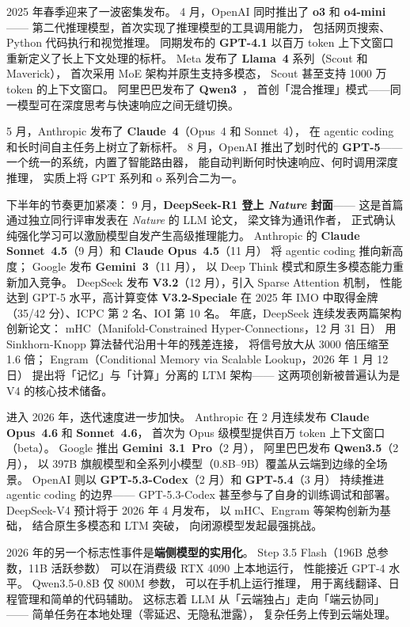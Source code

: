 2025 年春季迎来了一波密集发布。
4 月，OpenAI 同时推出了 \textbf{o3} 和 \textbf{o4-mini}——
第二代推理模型，首次实现了推理模型的工具调用能力，
包括网页搜索、Python 代码执行和视觉推理。
同期发布的 \textbf{GPT-4.1} 以百万 token 上下文窗口
重新定义了长上下文处理的标杆。
Meta 发布了 \textbf{Llama~4} 系列（Scout 和 Maverick），
首次采用 MoE 架构并原生支持多模态，
Scout 甚至支持 1000 万 token 的上下文窗口。
阿里巴巴发布了 \textbf{Qwen3}~\cite{qwen2025qwen3}，
首创「混合推理」模式——同一模型可在深度思考与快速响应之间无缝切换。

5 月，Anthropic 发布了 \textbf{Claude~4}（Opus~4 和 Sonnet~4），
在 agentic coding 和长时间自主任务上树立了新标杆。
8 月，OpenAI 推出了划时代的 \textbf{GPT-5}——
一个统一的系统，内置了智能路由器，
能自动判断何时快速响应、何时调用深度推理，
实质上将 GPT 系列和 o 系列合二为一。

下半年的节奏更加紧凑：
9 月，\textbf{DeepSeek-R1 登上 \textit{Nature} 封面}——
这是首篇通过独立同行评审发表在 \textit{Nature} 的 LLM 论文，
梁文锋为通讯作者，
正式确认纯强化学习可以激励模型自发产生高级推理能力。
Anthropic 的 \textbf{Claude Sonnet~4.5}（9 月）和 \textbf{Claude Opus~4.5}（11 月）
将 agentic coding 推向新高度；
Google 发布 \textbf{Gemini~3}（11 月），
以 Deep Think 模式和原生多模态能力重新加入竞争。
DeepSeek 发布 \textbf{V3.2}（12 月），引入 Sparse Attention 机制，
性能达到 GPT-5 水平，高计算变体 \textbf{V3.2-Speciale}
在 2025 年 IMO 中取得金牌（35/42 分）、ICPC 第 2 名、IOI 第 10 名。
年底，DeepSeek 连续发表两篇架构创新论文：
mHC（Manifold-Constrained Hyper-Connections，12 月 31 日）
用 Sinkhorn-Knopp 算法替代沿用十年的残差连接，
将信号放大从 3000 倍压缩至 1.6 倍；
Engram（Conditional Memory via Scalable Lookup，2026 年 1 月 12 日）
提出将「记忆」与「计算」分离的 LTM 架构——
这两项创新被普遍认为是 V4 的核心技术储备。

进入 2026 年，迭代速度进一步加快。
Anthropic 在 2 月连续发布 \textbf{Claude Opus~4.6} 和 \textbf{Sonnet~4.6}，
首次为 Opus 级模型提供百万 token 上下文窗口（beta）。
Google 推出 \textbf{Gemini~3.1~Pro}（2 月），
阿里巴巴发布 \textbf{Qwen3.5}（2 月），
以 397B 旗舰模型和全系列小模型（0.8B--9B）覆盖从云端到边缘的全场景。
OpenAI 则以 \textbf{GPT-5.3-Codex}（2 月）和 \textbf{GPT-5.4}（3 月）
持续推进 agentic coding 的边界——
GPT-5.3-Codex 甚至参与了自身的训练调试和部署。
DeepSeek-V4 预计将于 2026 年 4 月发布，
以 mHC、Engram 等架构创新为基础，
结合原生多模态和 LTM 突破，
向闭源模型发起最强挑战。

2026 年的另一个标志性事件是\textbf{端侧模型的实用化}。
Step 3.5 Flash（196B 总参数，11B 活跃参数）
可以在消费级 RTX 4090 上本地运行，
性能接近 GPT-4 水平。
Qwen3.5-0.8B 仅 800M 参数，
可以在手机上运行推理，
用于离线翻译、日程管理和简单的代码辅助。
这标志着 LLM 从「云端独占」走向「端云协同」——
简单任务在本地处理（零延迟、无隐私泄露），
复杂任务上传到云端处理。

